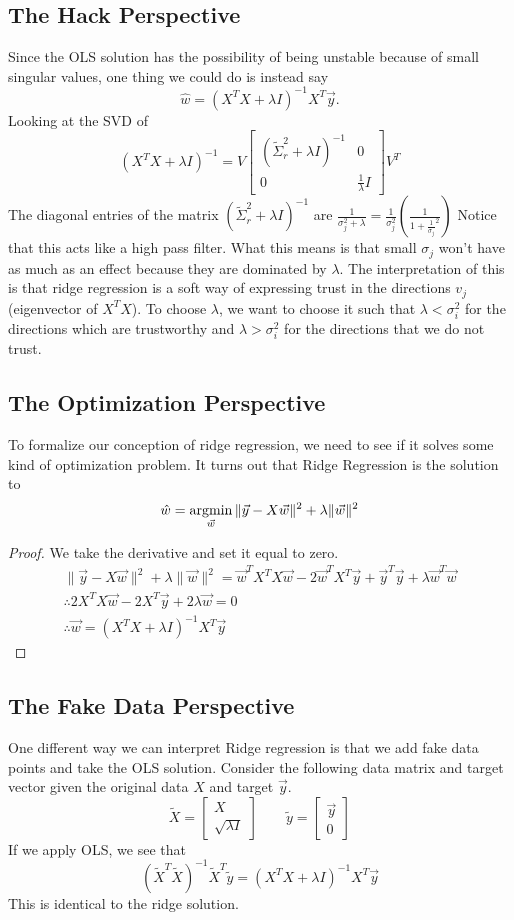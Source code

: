 \subsection{The Hack Perspective}
Since the OLS solution has the possibility of being unstable because of small singular values, one thing we could do is instead say
$$\hat{w} = (X^TX + \lambda I)^{-1}X^T\vec{y}.$$
Looking at the SVD of 
\[
  (X^TX+\lambda I)^{-1} = V \begin{bmatrix}
    (\tilde{\Sigma}_r^2 + \lambda I)^{-1} & 0\\
    0 & \frac{1}{\lambda}I
  \end{bmatrix} V^T
\]
The diagonal entries of the matrix $(\tilde{\Sigma}_r^2 + \lambda I)^{-1}$ are $\frac{1}{\sigma_j^2+\lambda}=\frac{1}{\sigma_j^2}\left(\frac{1}{1+\frac{1}{\sigma_j}^2}\right)$
Notice that this acts like a high pass filter. What this means is that small $\sigma_j$ won't have as much as an effect because they are dominated by $\lambda$. The interpretation of this is that ridge regression is a soft way of expressing trust in the directions $v_j$ (eigenvector of $X^TX$). To choose $\lambda$, we want to choose it such that $\lambda<\sigma_i^2$ for the directions which are trustworthy and $\lambda>\sigma_i^2$ for the directions that we do not trust.
\subsection{The Optimization Perspective}
To formalize our conception of ridge regression, we need to see if it solves some kind of optimization problem. It turns out that Ridge Regression is the solution to
\[
  \hat{w} = \operatorname*{argmin}_{\vec{w}} \|\vec{y} - X\vec{w}\|^2 + \lambda \|\vec{w}\|^2
\]
\begin{proof}
  We take the derivative and set it equal to zero.
  \begin{align*}
    \|\vec{y}-X\vec{w}\|^2 + \lambda \|\vec{w}\|^2 = \vec{w}^TX^TX\vec{w}-2\vec{w}^TX^T\vec{y}+\vec{y}^T\vec{y}+\lambda\vec{w}^T\vec{w}\\
    \therefore 2X^TX\vec{w}-2X^T\vec{y}+2\lambda\vec{w} = 0\\
    \therefore \vec{w} = (X^TX+\lambda I)^{-1}X^T\vec{y}
    \label{proof:ridge-optimization}
  \end{align*}
\end{proof}
\subsection{The Fake Data Perspective}
One different way we can interpret Ridge regression is that we add fake data points and take the OLS solution. Consider the following data matrix and target vector given the original data $X$ and target $\vec{y}$.
\[
  \tilde{X} = \begin{bmatrix}
    X\\
    \sqrt{\lambda I}
  \end{bmatrix} \qquad \tilde{y} = \begin{bmatrix}
    \vec{y}\\
    0
  \end{bmatrix}
\]
If we apply OLS, we see that
\[
  (\tilde{X}^T\tilde{X})^{-1}\tilde{X}^T\tilde{y} = (X^TX+\lambda I)^{-1}X^T\vec{y}
\]
This is identical to the ridge solution.
